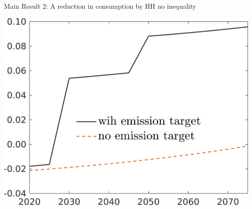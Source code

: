 \documentclass[11pt,aspectratio=169]{beamer}
\begin{document}
\begin{frame}{Main Result 2: A reduction in consumption by HH no inequality}
	\centering
	\begin{minipage}[]{0.32\textwidth}
		\includegraphics[width=1\textwidth]{../codding_model/own_basedOnFried/optimalPol_elastS_DisuSci/figures/all_1705/taul_TargetCompOPT_T_NoTaus_spillover0_sep1_BN1_ineq0_red0_etaa0.79_lgd1.png}
	\end{minipage}
\end{frame}
\appendix
\end{document}
